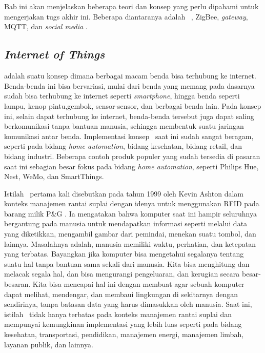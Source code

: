 \chapter{\babDua}
Bab ini akan menjelaskan beberapa teori dan konsep yang perlu dipahami untuk mengerjakan tugs akhir ini. Beberapa diantaranya adalah \iot~, ZigBee, \textit{gateway}, MQTT, dan \textit{social media} \iot.

\section{\textit{Internet of Things}}
\textit{\IOT} adalah suatu konsep dimana berbagai macam benda bisa terhubung ke internet. Benda-benda ini bisa bervariasi, mulai dari benda yang memang pada dasarnya sudah bisa terhubung ke internet seperti \textit{smartphone}, hingga benda seperti lampu, kenop pintu,gembok, sensor-sensor, dan berbagai benda lain. Pada konsep ini, selain dapat terhubung ke internet, benda-benda tersebut juga dapat saling berkomunikasi tanpa bantuan manusia, sehingga membentuk suatu jaringan komunikasi antar benda. Implementasi konsep \iot~saat ini sudah sangat beragam, seperti pada bidang \textit{home automation}, bidang kesehatan, bidang retail, dan bidang industri. Beberapa contoh produk populer yang sudah tersedia di pasaran saat ini sebagian besar fokus pada bidang \textit{home automation}, seperti Philips Hue, Nest, WeMo, dan SmartThings.

Istilah \iot~pertama kali disebutkan pada tahun 1999 oleh Kevin Ashton dalam konteks manajemen rantai suplai dengan idenya untuk menggunakan RFID pada barang milik P\&G \cite{AshtonIot}. Ia mengatakan bahwa komputer saat ini hampir seluruhnya bergantung pada manusia untuk mendapatkan informasi seperti melalui data yang diketikkan, mengambil gambar dari pemindai, menekan suatu tombol, dan lainnya. Masalahnya adalah, manusia memiliki waktu, perhatian, dan ketepatan yang terbatas. Bayangkan jika komputer bisa mengetahui segalanya tentang suatu hal tanpa bantuan sama sekali dari manusia. Kita bisa menghitung dan melacak segala hal, dan bisa mengurangi pengeluaran, dan kerugian secara besar-besaran. Kita bisa mencapai hal ini dengan membuat agar sebuah komputer dapat melihat, mendengar, dan membaui lingkungan di sekitarnya dengan sendirinya, tanpa batasan data yang harus dimasukkan oleh manusia\cite{AshtonIot}. Saat ini, istilah \iot~tidak hanya terbatas pada konteks manajemen rantai suplai dan mempunyai kemungkinan implementasi yang lebih luas seperti pada bidang kesehatan, transportasi, pendidikan, manajemen energi, manajemen limbah, layanan publik, dan lainnya.

